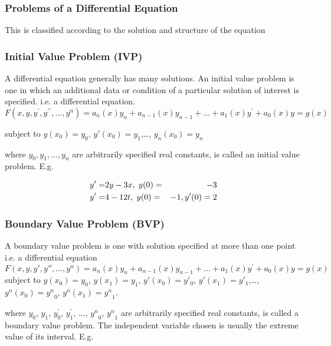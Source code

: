 \documentclass[12pt]{article}
\begin{document}
	\bigskip
	\subsubsection*{Problems of a Differential Equation}\label{sec: Problems of ODE}
	This is classified according to the solution and structure of the equation
	\subsubsection*{Initial Value Problem (IVP)}
	A differential equation generally has many solutions. An initial value problem is one in which an additional data or condition of a particular solution of interest is specified. i.e. a differential equation.
	\begin{equation}
	F(x,y,y^\prime,y^{\prime\prime},\dots,y^n ) = a_n(x)y_n + a_{n-1}(x)y_{n-1} + \dots + a_1(x)y^\prime + a_0(x)y = g(x)  
	\end{equation}
	
	subject to
	$y(x_0) = y_0$, $y'(x_0) = y_1$,…, $y_n(x_0) = y_n$
	
	where $y_0, y_1, \dots , y_n$ are arbitrarily specified real constants, is called an initial value problem. E.g.
	
	\begin{eqnarray}
	y' =& 2y - 3x,\hspace{1mm} y(0) =& -3\\
	y'=& 4 - 12t,\hspace{1mm} y(0) =& -1, y'(0) = 2
	\end{eqnarray}
	
	\subsubsection*{Boundary Value Problem (BVP)}
	A boundary value problem is one with solution specified at more than one point i.e. a differential equation\\
	\begin{equation}
	F(x,y,y',y'',\dots,y^n ) = a_n(x)y_n + a_{n-1}(x)y_{n-1} +\dots+ a_1(x)y^\prime + a_0(x)y = g(x)
	\end{equation}  subject to
	$y(x_0) = y_0$, $y(x_1) = y_1$, $y'(x_0) = y'_0$, $y'(x_1) = y'_1$,…, $y^n(x_0) = {y^n}_0$, $y^n(x_1) = {y^n}_1$. 
	
	where $y_0$, $y_1$, $y^\prime_0$, $y^\prime_1$, ..., ${y^n}_0$, ${y^n}_1$ are arbitrarily specified real constants, is called a boundary value problem. The independent variable chosen is usually the extreme value of its interval. E.g.
	
\end{document}
